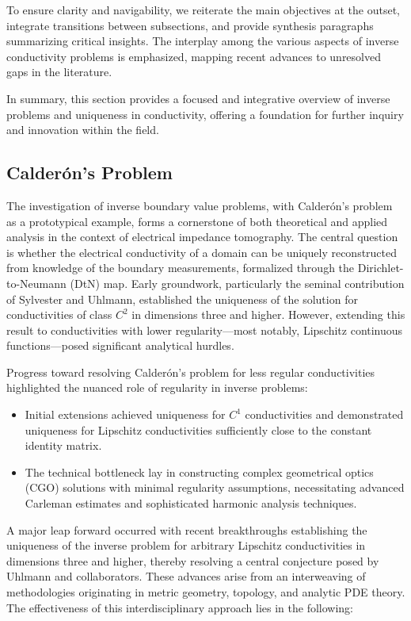 \documentclass[sigconf]{acmart}
\begin{document}
To ensure clarity and navigability, we reiterate the main objectives at the outset, integrate transitions between subsections, and provide synthesis paragraphs summarizing critical insights. The interplay among the various aspects of inverse conductivity problems is emphasized, mapping recent advances to unresolved gaps in the literature.

In summary, this section provides a focused and integrative overview of inverse problems and uniqueness in conductivity, offering a foundation for further inquiry and innovation within the field.

\subsection{Calderón's Problem}

The investigation of inverse boundary value problems, with Calderón's problem as a prototypical example, forms a cornerstone of both theoretical and applied analysis in the context of electrical impedance tomography. The central question is whether the electrical conductivity of a domain can be uniquely reconstructed from knowledge of the boundary measurements, formalized through the Dirichlet-to-Neumann (DtN) map. Early groundwork, particularly the seminal contribution of Sylvester and Uhlmann, established the uniqueness of the solution for conductivities of class $C^2$ in dimensions three and higher. However, extending this result to conductivities with lower regularity---most notably, Lipschitz continuous functions---posed significant analytical hurdles.

Progress toward resolving Calderón's problem for less regular conductivities highlighted the nuanced role of regularity in inverse problems:

\begin{itemize}
    \item Initial extensions achieved uniqueness for $C^1$ conductivities and demonstrated uniqueness for Lipschitz conductivities sufficiently close to the constant identity matrix.
    \item The technical bottleneck lay in constructing complex geometrical optics (CGO) solutions with minimal regularity assumptions, necessitating advanced Carleman estimates and sophisticated harmonic analysis techniques.
\end{itemize}

A major leap forward occurred with recent breakthroughs establishing the uniqueness of the inverse problem for arbitrary Lipschitz conductivities in dimensions three and higher, thereby resolving a central conjecture posed by Uhlmann and collaborators. These advances arise from an interweaving of methodologies originating in metric geometry, topology, and analytic PDE theory. The effectiveness of this interdisciplinary approach lies in the following:
\end{document}
